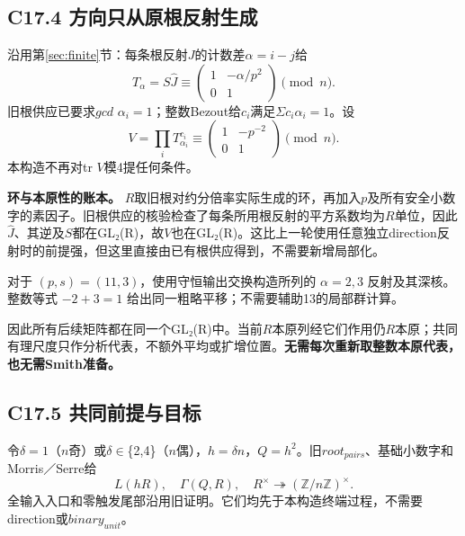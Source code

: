 \subsection*{\texorpdfstring{{C17.4} {方向只从原根反射生成}}{C17.4 方向只从原根反射生成}}\label{C17-h126}

{沿用}第\ref{sec:finite}节{：每条根反射\ensuremath{J}的计数差\ensuremath{\alpha =i-j}给} \[
T_\alpha=S\widehat J
\equiv\begin{pmatrix}1&-\alpha/p^2\\0&1\end{pmatrix}\pmod n.
\] {旧根供应已要求\ensuremath{gcd}} {\ensuremath{\alpha _{i}=1}；整数Bezout给\ensuremath{c_{i}}满足\ensuremath{\Sigma c_{i}\alpha _{i}=1}。设} \[
\boxed{V=\prod_iT_{\alpha_i}^{c_i}
\equiv\begin{pmatrix}1&-p^{-2}\\0&1\end{pmatrix}\pmod n.}
\tag{C17.4.1}
\] {本构造不再对tr} {\ensuremath{V}模4提任何条件。}

\textbf{{环与本原性的账本。}} {\ensuremath{R}取旧根对约分倍率实际生成的环，再加入\ensuremath{p}及所有安全小数字的素因子。旧根供应的核验检查了每条所用根反射的平方系数均为\ensuremath{R}单位，因此}\(\widehat J\){、其逆及\ensuremath{S}都在GL₂(R)，故\ensuremath{V}也在GL₂(R)。这比上一轮使用任意独立direction反射时的前提强，但这里直接由已有根供应得到，不需要新增局部化。}

{对于} \((p,s)=(11,3)\){，使用守恒输出交换构造所列的} \(\alpha=2,3\) {反射及其深核。整数等式} \(-2+3=1\) {给出同一粗略平移；不需要辅助13的局部群计算。}

{因此所有后续矩阵都在同一个GL₂(R)中。当前\ensuremath{R}本原列经它们作用仍\ensuremath{R}本原；共同有理尺度只作分析代表，不额外平均或扩增位置。}\textbf{{无需每次重新取整数本原代表，也无需Smith准备。}}

\subsection*{\texorpdfstring{{C17.5} {共同前提与目标}}{C17.5 共同前提与目标}}\label{C17-h127}

{令\ensuremath{\delta =1}（\ensuremath{n}奇）或\ensuremath{\delta }\ensuremath{\in}\{2,4\}（\ensuremath{n}偶），\ensuremath{h=\delta n}，\ensuremath{Q=h^{2}}。旧\ensuremath{root_{pairs}}、基础小数字和Morris／Serre给} \[
L(hR),\quad\Gamma(Q,R),\quad
R^\times\twoheadrightarrow(\mathbb Z/n\mathbb Z)^\times.
\] {全输入入口和零触发尾部沿用旧证明。它们均先于本构造终端过程，不需要direction或\ensuremath{binary_{unit}}。}

